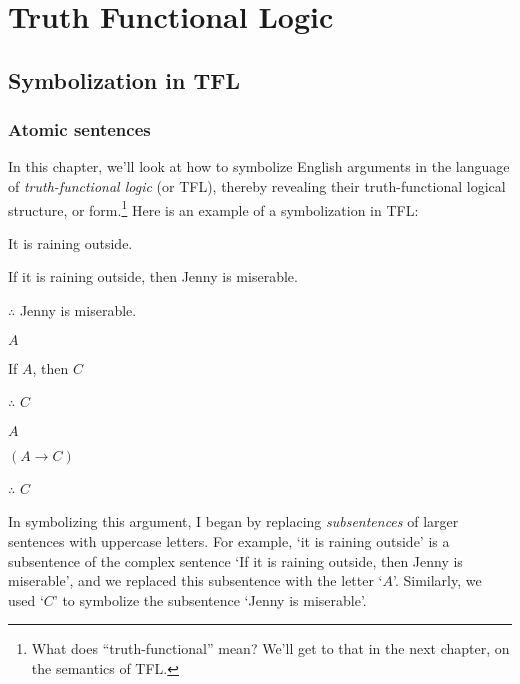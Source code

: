 \part{Truth Functional Logic}
\chapter{Symbolization in TFL}



\section{Atomic sentences}

In this chapter, we'll look at how to symbolize English arguments in the language of \emph{truth-functional logic} (or TFL), thereby revealing their truth-functional logical structure, or form.\footnote{What does ``truth-functional'' mean?  We'll get to that in the next chapter, on the semantics of TFL.}  Here is an example of a symbolization in TFL:


	\begin{earg}
		\item[\ex{exarg1}] It is raining outside.
		\item[] If it is raining outside, then Jenny is miserable.
		\item[] $\therefore$ Jenny is miserable.
	\end{earg}


\begin{multicols}{2}

	\begin{earg}
		\item[] $A$
		\item[] If $A$, then $C$
		\item[] $\therefore$ $C$
	\end{earg}

\columnbreak

	\begin{earg}
		\item[] $A$
		\item[] $(A \rightarrow C)$
		\item[] $\therefore$ $C$
	\end{earg}
	
	
\end{multicols}


In symbolizing this argument, I began by replacing  \emph{subsentences} of larger sentences with uppercase letters. For example, `it is raining outside' is a subsentence of the complex sentence `If it is raining outside, then Jenny is miserable', and we replaced this subsentence with the letter `$A$'.  Similarly, we used `$C$' to symbolize the subsentence `Jenny is miserable'. 

